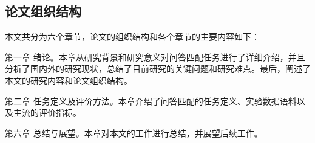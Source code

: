 \subsection{论文组织结构}

本文共分为六个章节，论文的组织结构和各个章节的主要内容如下：

第一章 \quad 绪论。本章从研究背景和研究意义对问答匹配任务进行了详细介绍，并且分析了国内外的研究现状，总结了目前研究的关键问题和研究难点。最后，阐述了本文的研究内容和论文组织结构。

第二章 \quad 任务定义及评价方法。本章介绍了问答匹配的任务定义、实验数据语料以及主流的评价指标。




第六章 \quad 总结与展望。本章对本文的工作进行总结，并展望后续工作。



